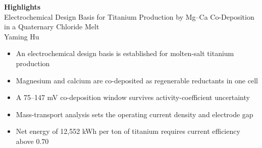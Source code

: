 \documentclass[11pt,a4paper]{article}
\begin{document}
\begin{center}
  {\Large\bfseries Highlights}\\[0.9em]
  {\normalsize Electrochemical Design Basis for Titanium Production by Mg--Ca Co-Deposition in a Quaternary Chloride Melt}\\[0.35em]
  {\small Yaming Hu}
\end{center}

\vspace{1.2em}

\singlespacing

\begin{itemize}\setlength{\itemsep}{0.45em}
  \item An electrochemical design basis is established for molten-salt titanium production
  \item Magnesium and calcium are co-deposited as regenerable reductants in one cell
  \item A 75--147 mV co-deposition window survives activity-coefficient uncertainty
  \item Mass-transport analysis sets the operating current density and electrode gap
  \item Net energy of 12{,}552 kWh per ton of titanium requires current efficiency above 0.70
\end{itemize}
\end{document}
